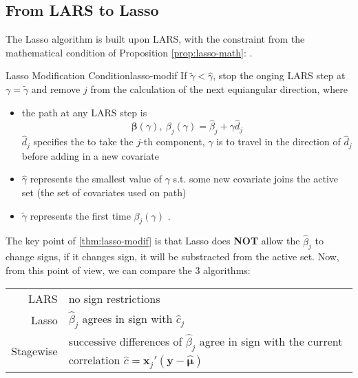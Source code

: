 \documentclass[twoside]{article}
\begin{document}
\subsection{From LARS to Lasso}
The Lasso algorithm is built upon LARS, with the constraint from the mathematical condition of Proposition \ref{prop:lasso-math}: . 

\begin{theorem}{Lasso Modification Condition}{lasso-modif}
    If $\tilde{\gamma}< \hat{\gamma}$, stop the onging LARS step at $\gamma = \tilde{\gamma}$ and remove $j$ from the calculation of the next equiangular direction, where
    \begin{itemize}
        \item the path at any LARS step is $$\boldsymbol{\beta}(\gamma),\ \beta_j(\gamma) = \hat{\beta}_j + \gamma\hat{d}_j$$ $\hat{d}_j$ specifies the  to take the $j$-th component, $\gamma$ is  to travel in the direction of $\hat{d}_j$ before adding in a new covariate
        \item $\hat{\gamma}$ represents the smallest  value of $\gamma$ s.t. some new covariate joins the active set (the set of covariates used on path)
        \item $\tilde{\gamma}$ represents the first time $\beta_j(\gamma)$ .
    \end{itemize}
\end{theorem}
The key point of \ref{thm:lasso-modif} is that Lasso does \textbf{NOT} allow the $\hat{\beta}_j$ to change signs, if it changes sign, it will be substracted from the active set. Now, from this point of view, we can compare the 3 algorithms:

\begin{center}
    \begin{tabular}{ r|l } 
     \hline
     LARS & no sign restrictions  \\ 
     Lasso &  $\hat{\beta}_j$ agrees in sign with $\hat{c}_j$ \\
     Stagewise & successive differences of $\hat{\beta}_j $ agree in sign with the current correlation $\hat{c}=\mathbf{x}_j'(\mathbf{y}-\hat{\boldsymbol{\mu}})$\\
     \hline
    \end{tabular}
\end{center}
\end{document}

